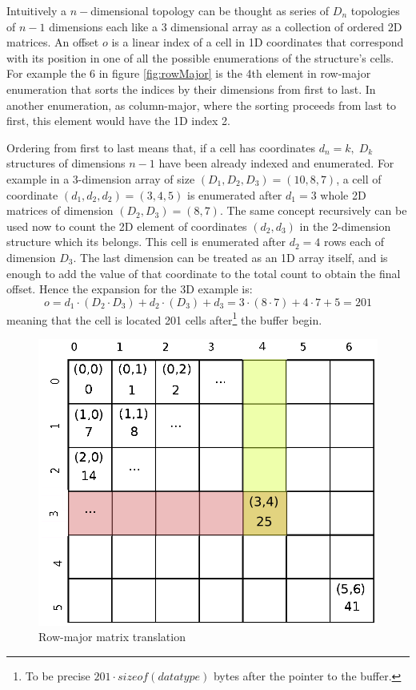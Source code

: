 Intuitively a \(n-\)dimensional topology can be thought as series of \(D_n\)
topologies of \(n-1\) dimensions each like a 3 dimensional array as a
collection of ordered 2D matrices.
An offset \(o\) is a linear index of a cell in 1D coordinates that correspond
with its position in one of all the possible enumerations of the structure's
cells. For example the \(6\) in figure \ref{fig:rowMajor} is the 4th element in
row-major enumeration that sorts the indices by their dimensions from first to
last. In another enumeration, as column-major, where the sorting proceeds from
last to first, this element would have the 1D index 2.

Ordering from first to last means that, if a cell has coordinates \(d_n=k, \;
D_k\) structures of dimensions \(n-1\) have been already indexed and enumerated.
For example in a 3-dimension array of size \((D_1,D_2,D_3)= (10,8,7)\), a cell
of coordinate \((d_1,d_2,d_2)=(3,4,5)\)  is enumerated after \(d_1=3\) whole 2D
matrices of dimension \((D_2,D_3)=(8,7)\). The same concept recursively can be
used now to count the 2D element of coordinates \((d_2,d_3)\) in the 2-dimension
structure which its belongs. This cell is enumerated after \(d_2=4\) rows each
of dimension \(D_3\). The last dimension can be treated as an 1D array itself,
and is enough to add the value of that coordinate to the total count to obtain
the final offset. Hence the expansion for the 3D example is:
\[ o=d_1 \cdot (D_2 \cdot D_3) + d_2 \cdot (D_3) + d_3 = 3 \cdot (8 \cdot 7) + 4
\cdot 7 + 5= 201 \] meaning that the cell is located 201 cells after\footnote{To
be precise \(201 \cdot sizeof(data type)\) bytes after the pointer to the buffer.}
the buffer begin.
\begin{figure}
\begin{center}
\includegraphics[trim=1.2cm 0cm 0cm 0cm, clip=true]{./images/RowMajor2D}
\caption{Row-major matrix translation}
\label{fig:rowMajor2DExample}
\end{center}
\end{figure}

